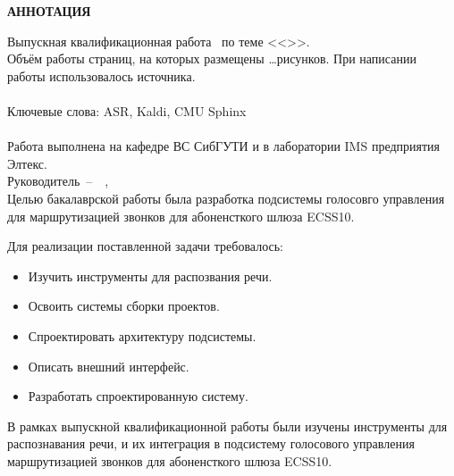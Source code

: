 \begin{center}
    \bf
    АННОТАЦИЯ
\end{center}


\noindent
Выпускная квалификационная работа \fioa\ по теме <<\topicname>>.
\hfill \\
Объём работы \pageref{LastPage} страниц, на которых размещены \dots рисунков.
При написании работы использовалось  источника. \\
\hfill \\
Ключевые слова: ASR, Kaldi, CMU Sphinx \\
\hfill \\
Работа выполнена на кафедре ВС СибГУТИ и в лаборатории IMS предприятия Элтекс. \\
Руководитель~--~\theadpos~\thead, \\


Целью бакалаврской работы была разработка подсистемы голосовго управления
для маршрутизацией звонков для абоненсткого шлюза ECSS10.


Для реализации поставленной задачи требовалось:
\begin{itemize}
    \item Изучить инструменты для распозвания речи.
    \item Освоить системы сборки проектов.
    \item Спроектировать архитектуру подсистемы.
    \item Описать внешний интерфейс.
    \item Разработать спроектированную систему.
\end{itemize}


В рамках выпускной квалификационной работы были изучены инструменты для
распознавания речи, и их интеграция в подсистему голосового управления
маршрутизацией звонков для абоненсткого шлюза ECSS10.


\thispagestyle{empty}
